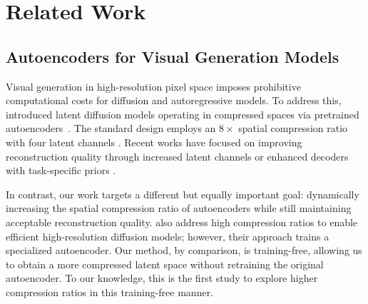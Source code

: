 \section{Related Work}
\subsection{Autoencoders for Visual Generation Models} 
Visual generation in high-resolution pixel space imposes prohibitive computational costs for diffusion and autoregressive models. To address this, \citet{rombach2022high} introduced latent diffusion models operating in compressed spaces via pretrained autoencoders~\cite{kingma2013auto}. The standard design employs an $8\times$ spatial compression ratio with four latent channels \citep{peebles2023scalable,li2024autoregressive,tian2024visual}. Recent works have focused on improving reconstruction quality through increased latent channels \citep{esser2024scaling} or enhanced decoders with task-specific priors \citep{zhu2023designing}.

In contrast, our work targets a different but equally important goal: dynamically increasing the spatial compression ratio of autoencoders while still maintaining acceptable reconstruction quality. \citet{chen2024deep} also address high compression ratios to enable efficient high-resolution diffusion models; however, their approach trains a specialized autoencoder. Our method, by comparison, is training-free, allowing us to obtain a more compressed latent space without retraining the original autoencoder. To our knowledge, this is the first study to explore higher compression ratios in this training-free manner. 

